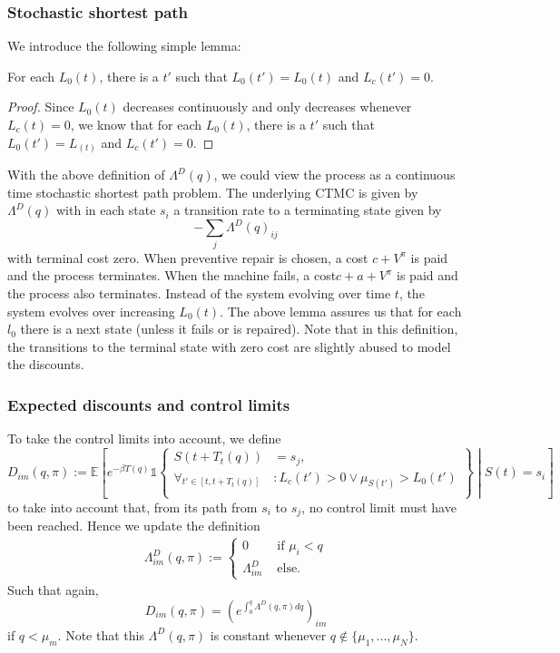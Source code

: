 \subsubsection{Stochastic shortest path}
We introduce the following simple lemma:
\begin{lemma}
For each $L_0(t)$, there is a $t'$ such that $L_0(t')=L_0(t)$ and $L_c(t')=0$.
\end{lemma}
\begin{proof}
Since $L_0(t)$ decreases continuously and only decreases whenever $L_c(t)=0$, we know that for each $L_0(t)$, there is a $t'$ such that $L_0(t')=L_(t)$ and $L_c(t')=0$.
\end{proof}

With the above definition of $\Lambda^D(q)$, we could view the process as a continuous time stochastic shortest path problem.
The underlying CTMC is given by $\Lambda^D(q)$ with in each state $s_i$ a transition rate to a terminating state given by
$$
-\sum_j \Lambda^D(q)_{ij}
$$
with terminal cost zero.
When preventive repair is chosen, a cost $c+V^\pi$ is paid and the process terminates.
When the machine fails, a cost$c+a+V^\pi$ is paid and the process also terminates.
Instead of the system evolving over time $t$, the system evolves over increasing $L_0(t)$.
The above lemma assures us that for each $l_0$ there is a next state (unless it fails or is repaired).
Note that in this definition, the transitions to the terminal state with zero cost are slightly abused to model the discounts.

\subsubsection{Expected discounts and control limits}
To take the control limits into account, we define
$$D_{im}(q,\pi):=\mathbb{E}\left[e^{-\beta T(q)}\mathds{1}\left\{\begin{split}
S(t+T_t(q))&=s_j,\\
\forall_{t'\in[t,t+T_t(q)]}&:L_c(t')>0\vee\mu_{S(t')}>L_0(t')\\
\end{split}\right\}\middle|S(t)=s_i\right]$$
to take into account that, from its path from $s_i$ to $s_j$, no control limit must have been reached.
Hence we update the definition
\begin{equation}
\begin{split}
\Lambda^D_{im}(q,\pi):=\begin{cases}
0&\text{ if }\mu_i<q\\
\Lambda^D_{im}&\text{ else.}
\end{cases}
\end{split}
\end{equation}
Such that again,
\begin{equation}
D_{im}(q,\pi)=\left(e^{\int_0^q\Lambda^D(q,\pi)dq}\right)_{im}
\end{equation}
if $q<\mu_m$.
Note that this $\Lambda^D(q,\pi)$ is constant whenever $q\not\in\{\mu_1,...,\mu_N\}$.

